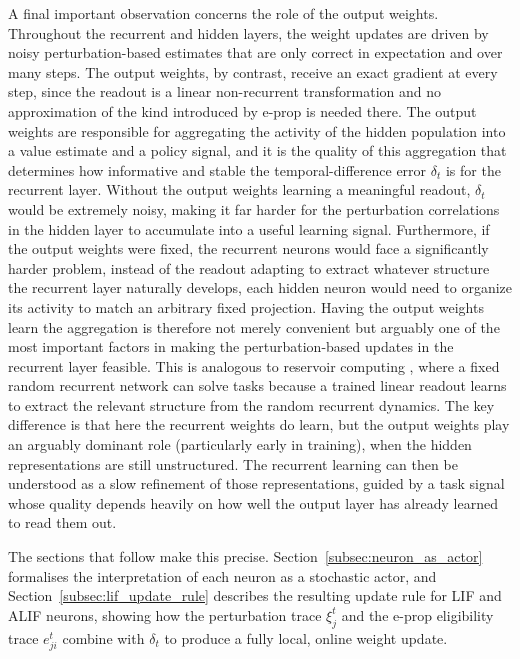     A final important observation concerns the role of the output weights. Throughout the
    recurrent and hidden layers, the weight updates are driven by noisy perturbation-based
    estimates that are only correct in expectation and over many steps. The output weights,
    by contrast, receive an exact gradient at every step, since the readout is a linear
    non-recurrent transformation and no approximation of the kind introduced by e-prop is
    needed there. The output weights are responsible for
    aggregating the activity of the hidden population into a value estimate and a policy
    signal, and it is the quality of this aggregation that determines how informative and
    stable the temporal-difference error $\delta_t$ is for the recurrent layer. Without the
    output weights learning a meaningful readout, $\delta_t$ would be extremely noisy,
    making it far harder for the perturbation correlations in the hidden layer to accumulate
    into a useful learning signal. Furthermore, if the output weights were fixed, the
    recurrent neurons would face a significantly harder problem, instead of the readout
    adapting to extract whatever structure the recurrent layer naturally develops, each
    hidden neuron would need to organize its activity to match an arbitrary fixed
    projection. Having the output weights learn the aggregation is therefore not merely
    convenient but arguably one of the most important factors in making the perturbation-based
    updates in the recurrent layer feasible. This is analogous to reservoir computing
    \citep{Maass2002LSM}, where a fixed random recurrent network can solve
    tasks because a trained linear readout learns to extract the relevant
    structure from the random recurrent dynamics.
    The key difference is that here the recurrent weights do learn, but the output weights
    play an arguably dominant role (particularly early in training), when the
    hidden representations are still unstructured. The recurrent learning can then be
    understood as a slow refinement of those representations, guided by a task signal whose
    quality depends heavily on how well the output layer has already learned to read them
    out.
    
    The sections that follow make this precise. Section~\ref{subsec:neuron_as_actor} formalises
    the interpretation of each neuron as a stochastic actor, and
    Section~\ref{subsec:lif_update_rule} describes the resulting update rule for LIF and ALIF
    neurons, showing how the perturbation trace $\xi_j^t$ and the e-prop eligibility trace
    $e_{ji}^t$ combine with $\delta_t$ to produce a fully local, online weight update.

